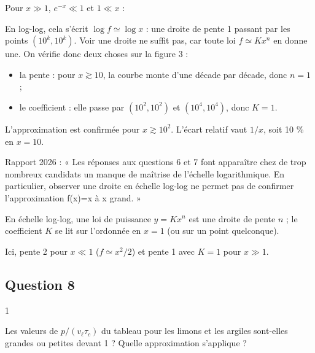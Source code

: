 \documentclass[11pt,a4paper]{article}
\providecommand{\tightlist}{\setlength{\itemsep}{0pt}\setlength{\parskip}{0pt}}
\newcommand{\equationajustee}[1]{%
  \sbox{\boiteequation}{$\displaystyle #1$}%
  \ifdim\wd\boiteequation>\linewidth
    \[\resizebox{\linewidth}{!}{\usebox{\boiteequation}}\]%
  \else
    \[#1\]%
  \fi}
\begin{document}
Pour \(x\gg1\), \(e^{-x}\ll1\) et \(1\ll x\) :

\equationajustee{\boxed{f(x)\simeq x}}

En log-log, cela s'écrit \(\log f\simeq\log x\) : une droite de pente 1 passant par les points \((10^k,10^k)\). Voir une droite ne suffit pas, car toute loi \(f\simeq Kx^n\) en donne une. On vérifie donc deux choses sur la figure 3 :

\begin{itemize}
\tightlist
\item
  la pente : pour \(x\gtrsim10\), la courbe monte d'une décade par décade, donc \(n=1\) ;
\item
  le coefficient : elle passe par \((10^2,10^2)\) et \((10^4,10^4)\), donc \(K=1\).
\end{itemize}

L'approximation est confirmée pour \(x\gtrsim10^2\). L'écart relatif vaut \(1/x\), soit 10 \% en \(x=10\).

\begin{jury}

Rapport 2026 : « Les réponses aux questions 6 et 7 font apparaître chez de trop nombreux candidats un manque de maîtrise de l'échelle logarithmique. En particulier, observer une droite en échelle log-log ne permet pas de confirmer l'approximation f(x)=x à x grand. »

\end{jury}

\begin{methode}

En échelle log-log, une loi de puissance \(y=Kx^n\) est une droite de pente \(n\) ; le coefficient \(K\) se lit sur l'ordonnée en \(x=1\) (ou sur un point quelconque).

Ici, pente 2 pour \(x\ll1\) (\(f\simeq x^2/2\)) et pente 1 avec \(K=1\) pour \(x\gg1\).

\end{methode}

\hypertarget{question-8}{%
\subsection{Question 8}\label{question-8}}

\begin{indication}{1}

Les valeurs de \(p/(v_\ell\tau_c)\) du tableau pour les limons et les argiles sont-elles grandes ou petites devant 1 ? Quelle approximation s'applique ?

\end{indication}
\end{document}
